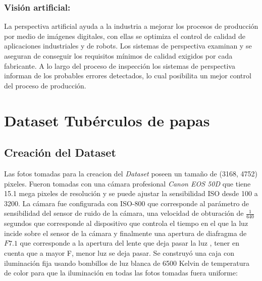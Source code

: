 	\subsection{\textbf{Visión artificial:}} La perspectiva artificial ayuda a la industria a mejorar los procesos de producción por medio de imágenes digitales, con ellas se optimiza el control de calidad de aplicaciones industriales y de robots. Los sistemas de perspectiva examinan y se aseguran de conseguir los requisitos mínimos de calidad exigidos por cada fabricante. A lo largo del proceso de inspección los sistemas de perspectiva informan de los probables errores detectados, lo cual posibilita un mejor control del proceso de producción.






\chapter{Dataset Tubérculos de papas}


\section{Creación del Dataset}
	Las fotos tomadas para la creacion del \textit{Dataset} poseen un tamaño de (3168, 4752) pixeles. Fueron tomadas con una cámara profesional \textit{Canon EOS 50D} que tiene 15.1 mega pixeles de resolución y se puede ajustar la sensibilidad ISO desde 100 a 3200. La cámara fue configurada con ISO-800 que corresponde al parámetro de sensibilidad del sensor de ruido de la cámara, una velocidad de obturación de $\frac{1}{640}$ segundos que corresponde al dispositivo que controla el tiempo en el que la luz incide sobre el sensor de la cámara y finalmente una apertura de diafragma de $F7.1$ que corresponde a la apertura del lente que deja pasar la luz \cite{Camara}, tener en cuenta que a mayor F, menor luz se deja pasar. Se construyó una caja con iluminación fija usando bombillos de luz blanca de 6500 Kelvin de temperatura de color para que la iluminación en todas las fotos tomadas fuera uniforme:

